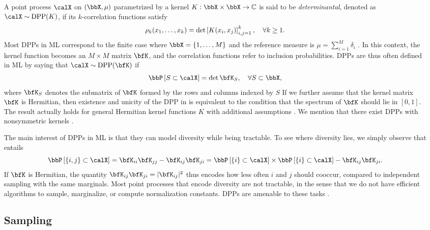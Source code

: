\documentclass[twoside,11pt]{article}
\begin{document}
    A point process $\calX$ on $(\bbX,\mu)$ parametrized by a kernel $K:\bbX\times \bbX\rightarrow \mathbb{C}$ is said to be \emph{determinantal}, denoted as $\calX\sim\DPP(K)$, if its $k$-correlation functions satisfy
	  \begin{equation*}
	  \label{eq:k-correlation_function_DPP}
	    \rho_k(x_1,\dots,x_k)
	      = \det \left[ K(x_i, x_j) \right]_{i,j=1}^k,
	    \quad \forall k\geq 1.
	  \end{equation*}
		Most DPPs in ML correspond to the finite case where $\bbX = \lrcb{1,\dots,M}$ and the reference measure is $\mu=\sum_{i=1}^M \delta_i$ \citep{KuTa12}.
		In this context, the kernel function becomes an $M\times M$ matrix $\bfK$, and the correlation functions refer to inclusion probabilities.
    DPPs are thus often defined in ML by saying that $\calX\sim \DPP(\bfK)$ if
	  \begin{equation}
	  \label{eq:inclusion_proba_finite}
	    \Proba{S \subset \calX} = \det {\bfK}_S,
	      \quad\forall S\subset \bbX,
	  \end{equation}
    where ${\bfK}_S$ denotes the submatrix of $\bfK$ formed by the rows and columns indexed by $S$
    If we further assume that the kernel matrix $\bfK$ is Hermitian, then existence and unicity of the DPP in  is equivalent to the condition that the spectrum of $\bfK$ should lie in $[0,1]$.
    The result actually holds for general Hermitian kernel functions $K$ with additional assumptions \cite[Theorem 3]{Sos00}.
    We mention that there exist DPPs with nonsymmetric kernels \citep{BoDiFu10}.

    The main interest of DPPs in ML is that they can model diversity while being tractable.
    To see where diversity lies, we simply observe that  entails
    $$ \Proba{\{i,j\} \subset \calX} = {\bfK}_{ii}{\bfK}_{jj}-{\bfK}_{ij}{\bfK}_{ji} = \Proba{\{i\} \subset \calX}\times \Proba{\{i\} \subset \calX} - {\bfK}_{ij}{\bfK}_{ji}.$$
    If $\bfK$ is Hermitian, the quantity ${\bfK}_{ij}{\bfK}_{ji} = \vert{\bfK}_{ij}\vert^2$ thus encodes how less often $i$ and $j$ should cooccur, compared to independent sampling with the same marginals.
    Most point processes that encode diversity are not tractable, in the sense that we do not have efficient algorithms to sample, marginalize, or compute normalization constants.
    DPPs are amenable to these tasks \citep{KuTa12}.

  \subsection{Sampling} %
  \label{sub:sampling}
\end{document}
